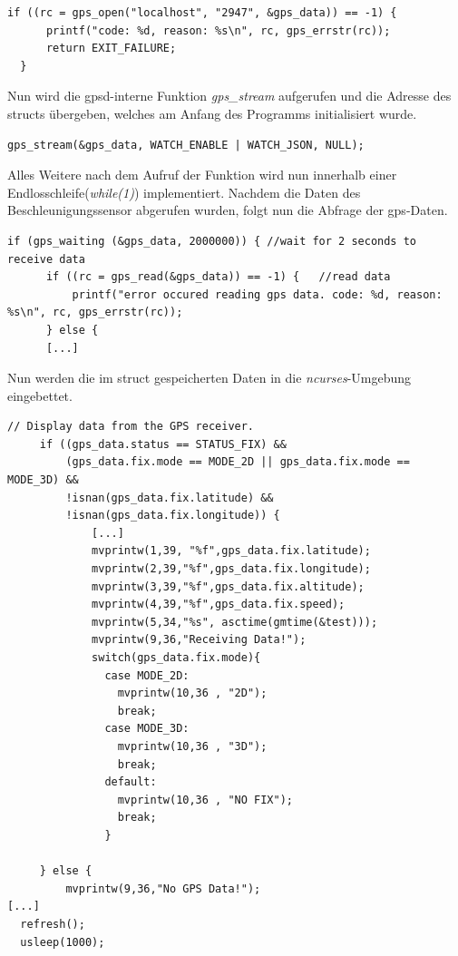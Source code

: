 \lstset{language=C}
\begin{lstlisting}[caption={Überprüfung ob der \ac{gpsd} aktiv ist},label={code:portopen}]
  if ((rc = gps_open("localhost", "2947", &gps_data)) == -1) {
      printf("code: %d, reason: %s\n", rc, gps_errstr(rc));
      return EXIT_FAILURE;
  }
 \end{lstlisting}

Nun wird die \ac{gpsd}-interne Funktion \emph{gps\_stream} aufgerufen und die Adresse des structs übergeben, welches
am Anfang des Programms initialisiert wurde.\\

\lstset{language=C}
\begin{lstlisting}[caption={Aufruf der \emph{gps\_stream}-Funktion und Übergabe der Adresse des structs },label={code:gpsstream}]
gps_stream(&gps_data, WATCH_ENABLE | WATCH_JSON, NULL);
 \end{lstlisting}

Alles Weitere nach dem Aufruf der Funktion wird nun innerhalb einer Endlosschleife(\emph{while(1)}) implementiert.
Nachdem die Daten des Beschleunigungssensor abgerufen wurden, folgt nun die Abfrage der \ac{gps}-Daten.\\

\lstset{language=C}
\begin{lstlisting}[caption={Abruf der \ac{gps}-Daten innerhalb einer Endlosschleife},label={code:gpsdata}]
  if (gps_waiting (&gps_data, 2000000)) { //wait for 2 seconds to receive data
      if ((rc = gps_read(&gps_data)) == -1) {   //read data
          printf("error occured reading gps data. code: %d, reason: %s\n", rc, gps_errstr(rc));
      } else {
      [...]
 \end{lstlisting}

Nun werden die im struct gespeicherten Daten in die \emph{ncurses}-Umgebung eingebettet.\\

\lstset{language=C}
\begin{lstlisting}[caption={Implementierung der \ac{gps}-Daten in die \emph{ncurses}-Umgebung},label={code:dispgpsdata}]
  // Display data from the GPS receiver.
     if ((gps_data.status == STATUS_FIX) &&
         (gps_data.fix.mode == MODE_2D || gps_data.fix.mode == MODE_3D) &&
         !isnan(gps_data.fix.latitude) &&
         !isnan(gps_data.fix.longitude)) {
             [...]
             mvprintw(1,39, "%f",gps_data.fix.latitude);
             mvprintw(2,39,"%f",gps_data.fix.longitude);
             mvprintw(3,39,"%f",gps_data.fix.altitude);
             mvprintw(4,39,"%f",gps_data.fix.speed);
             mvprintw(5,34,"%s", asctime(gmtime(&test)));
             mvprintw(9,36,"Receiving Data!");
             switch(gps_data.fix.mode){
               case MODE_2D:
                 mvprintw(10,36 , "2D");
                 break;
               case MODE_3D:
                 mvprintw(10,36 , "3D");
                 break;
               default:
                 mvprintw(10,36 , "NO FIX");
                 break;
               }

     } else {
         mvprintw(9,36,"No GPS Data!");
[...]
  refresh();
  usleep(1000);
 \end{lstlisting}

